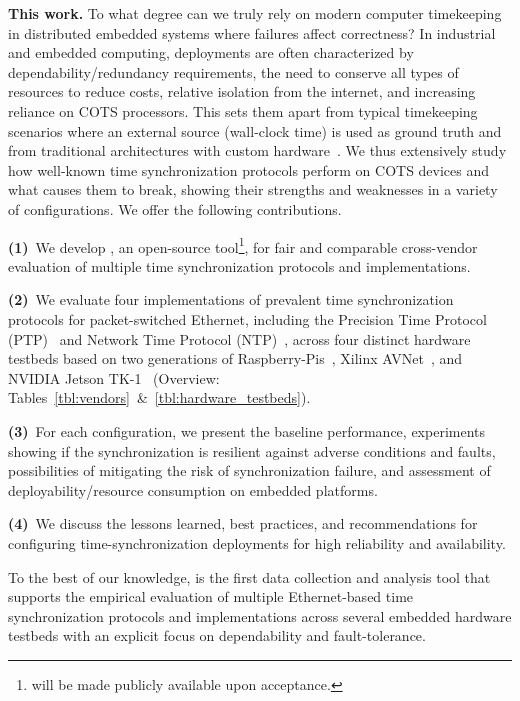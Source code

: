 \textbf{This work.}
To what degree can we truly rely on modern computer timekeeping in distributed embedded systems where failures affect correctness?
In industrial and embedded computing,
deployments are often characterized by dependability/redundancy requirements,
the need to conserve all types of resources to reduce costs,
relative isolation from the internet, %
and increasing reliance on COTS processors.
This sets them apart from typical timekeeping scenarios where an external source
(wall-clock time) is used as ground truth
and from traditional architectures with custom hardware~\cite{wensley1978sift,hopkins1978ftmp}.
We thus extensively study how well-known time synchronization protocols perform on COTS devices and what causes them to break,
showing their strengths and weaknesses in a variety of configurations.
We offer the following contributions.

\textbf{(1)}~We develop \toolName{}, an open-source tool\footnote{\toolName{} will be made publicly available upon acceptance.}, for fair and comparable cross-vendor evaluation of multiple time synchronization protocols and implementations.

\textbf{(2)}~We evaluate %
four implementations of prevalent time synchronization protocols for packet-switched Ethernet,
including the Precision Time Protocol (PTP)~\cite{ptp-spec} and Network Time Protocol (NTP)~\cite{ntpv4-spec},
across four distinct hardware testbeds
based on two generations of Raspberry-Pis~\cite{??, ??},
Xilinx AVNet~\cite{??}, and NVIDIA Jetson TK-1~\cite{??} (Overview: Tables~\ref{tbl:vendors}~\&~\ref{tbl:hardware_testbeds}).

\textbf{(3)}~For each configuration,
we present the baseline performance, %
experiments showing if the synchronization is resilient against adverse
conditions and faults,
possibilities of mitigating the risk of synchronization failure,
and assessment of deployability/resource consumption on embedded platforms.

\textbf{(4)}~We discuss the lessons learned, best practices, and recommendations
for configuring time-synchronization deployments for high reliability and availability.


To the best of our knowledge, \toolName{} is the first data collection and
analysis tool %
that supports the empirical evaluation of multiple Ethernet-based time
synchronization protocols and implementations across several embedded hardware
testbeds with an explicit focus on dependability and fault-tolerance.

